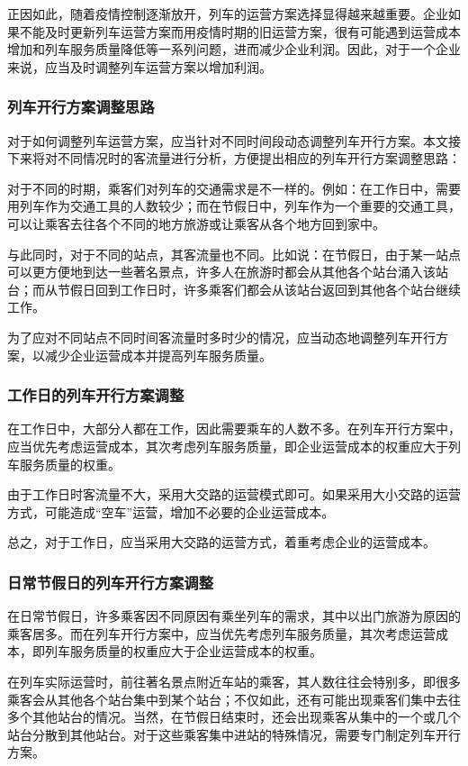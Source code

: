 正因如此，随着疫情控制逐渐放开，列车的运营方案选择显得越来越重要。企业如果不能及时更新列车运营方案而用疫情时期的旧运营方案，很有可能遇到运营成本增加和列车服务质量降低等一系列问题，进而减少企业利润。因此，对于一个企业来说，应当及时调整列车运营方案以增加利润。

\subsubsection{列车开行方案调整思路}

对于如何调整列车运营方案，应当针对不同时间段动态调整列车开行方案。本文接下来将对不同情况时的客流量进行分析，方便提出相应的列车开行方案调整思路：

对于不同的时期，乘客们对列车的交通需求是不一样的。例如：在工作日中，需要用列车作为交通工具的人数较少；而在节假日中，列车作为一个重要的交通工具，可以让乘客去往各个不同的地方旅游或让乘客从各个地方回到家中。

与此同时，对于不同的站点，其客流量也不同。比如说：在节假日，由于某一站点可以更方便地到达一些著名景点，许多人在旅游时都会从其他各个站台涌入该站台；而从节假日回到工作日时，许多乘客们都会从该站台返回到其他各个站台继续工作。

为了应对不同站点不同时间客流量时多时少的情况，应当动态地调整列车开行方案，以减少企业运营成本并提高列车服务质量。

\subsubsection{工作日的列车开行方案调整}

在工作日中，大部分人都在工作，因此需要乘车的人数不多。在列车开行方案中，应当优先考虑运营成本，其次考虑列车服务质量，即企业运营成本的权重应大于列车服务质量的权重。

由于工作日时客流量不大，采用大交路的运营模式即可。如果采用大小交路的运营方式，可能造成“空车”运营，增加不必要的企业运营成本。

总之，对于工作日，应当采用大交路的运营方式，着重考虑企业的运营成本。

\subsubsection{日常节假日的列车开行方案调整}

在日常节假日，许多乘客因不同原因有乘坐列车的需求，其中以出门旅游为原因的乘客居多。而在列车开行方案中，应当优先考虑列车服务质量，其次考虑运营成本，即列车服务质量的权重应大于企业运营成本的权重。

在列车实际运营时，前往著名景点附近车站的乘客，其人数往往会特别多，即很多乘客会从其他各个站台集中到某个站台；不仅如此，还有可能出现乘客们集中去往多个其他站台的情况。当然，在节假日结束时，还会出现乘客从集中的一个或几个站台分散到其他站台。对于这些乘客集中进站的特殊情况，需要专门制定列车开行方案。

